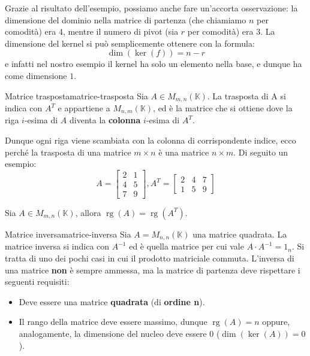 \documentclass[12pt]{report}
\newcommand{\K}{\mathbb{K}}
\newcommand{\rg}{\operatorname{rg}}
\begin{document}
	Grazie al risultato dell'esempio, possiamo anche fare un'accorta osservazione: la dimensione del dominio nella matrice di partenza (che chiamiamo $n$ per comodità) era $4$, mentre il numero di pivot (sia $r$ per comodità) era $3$. La dimensione del kernel si può semplicemente ottenere con la formula:
	\[
		\dim(\ker(f)) = n - r
	\]
	e infatti nel nostro esempio il kernel ha solo un elemento nella base, e dunque ha come dimensione $1$.
	
	\begin{definizione}{Matrice trasposta}{matrice-trasposta}
		Sia $A \in M_{m,n}(\K)$. La trasposta di A si indica con $A^T$ e appartiene a $M_{n,m}(\K)$, ed è la matrice che si ottiene dove la riga $i$-esima di $A$ diventa la \textbf{colonna} $i$-esima di $A^T$.
	\end{definizione}
	Dunque ogni riga viene scambiata con la colonna di corrispondente indice, ecco perché la trasposta di una matrice $m \times n$ è una matrice $n \times m$.
	Di seguito un esempio:
	\[
		A = 
		\begin{bmatrix}
			2 & 1\\
			4 & 5\\
			7 & 9
		\end{bmatrix}, A^T = 
		\begin{bmatrix}
			2 & 4 & 7\\
			1 & 5 & 9
		\end{bmatrix}
	\]
	
	\begin{proposizione}{}{}
		Sia $A \in M_{m,n}(\K)$, allora $\rg(A) = \rg(A^T)$.
	\end{proposizione}
	
	\newpage
	\begin{definizione}{Matrice inversa}{matrice-inversa}
		Sia $A = M_{n,n}(\K)$ una matrice quadrata. La matrice inversa si indica con $A^{-1}$ ed è quella matrice per cui vale $A \cdot A^{-1} = 1_n$. Si tratta di uno dei pochi casi in cui il prodotto matriciale commuta.
		L'inversa di una matrice \textbf{non} è sempre ammessa, ma la matrice di partenza deve rispettare i seguenti requisiti:
		
		\begin{itemize}
			\item Deve essere una matrice \textbf{quadrata} (di \textbf{ordine n}).
			\item Il rango della matrice deve essere massimo, dunque $\rg(A) = n$ oppure, analogamente, la dimensione del nucleo deve essere $0$ ($\dim(\ker(A)) = 0$).
		\end{itemize}
		
	\end{definizione}
	
\end{document}
